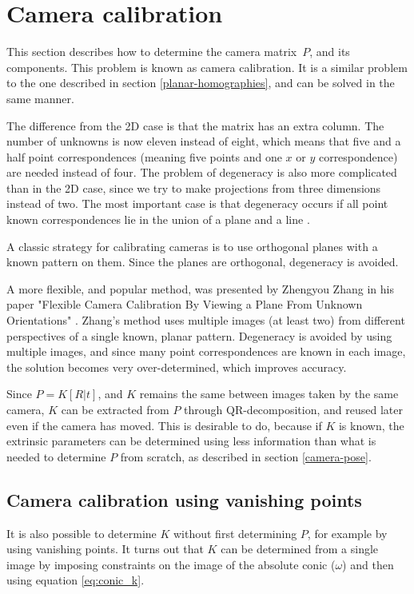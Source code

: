 \section{Camera calibration} \label{camera-calibration}
This section describes how to determine the camera matrix $P$, and its components.
This problem is known as camera calibration.
It is a similar problem to the one described in section \ref{planar-homographies}, and can be solved in the same manner.

The difference from the 2D case is that the matrix has an extra column. The number of unknowns is now eleven instead of eight, which means that five and a half point correspondences (meaning five points and one $x$ or $y$ correspondence) are needed instead of four.
The problem of degeneracy is also more complicated than in the 2D case, since we try to make projections from three dimensions instead of two.
The most important case is that degeneracy occurs if all point known correspondences lie in the union of a plane and a line \cite[p. 179-180]{hartley-zisserman}. 

A classic strategy for calibrating cameras is to use orthogonal planes with a known pattern on them. 
Since the planes are orthogonal, degeneracy is avoided.

A more flexible, and popular method, was presented by Zhengyou Zhang in his paper "Flexible Camera Calibration By Viewing a Plane From Unknown Orientations" \cite{zhang-calibration}.
Zhang's method uses multiple images (at least two) from different perspectives of a single known, planar pattern.
Degeneracy is avoided by using multiple images, and since many point correspondences are known in each image, the solution becomes very over-determined, which improves accuracy.

Since $P=K[R|t]$, and $K$ remains the same between images taken by the same camera, $K$ can be extracted from $P$ through QR-decomposition, and reused later even if the camera has moved. 
This is desirable to do, because if $K$ is known, the extrinsic parameters can be determined using less information than what is needed to determine $P$ from scratch, as described in section \ref{camera-pose}.

\subsection{Camera calibration using vanishing points} \label{background:vanishing_point_calibration}
It is also possible to determine $K$ without first determining $P$, for example by using vanishing points.
It turns out that $K$ can be determined from a single image by imposing constraints on the image of the absolute conic ($\omega$) and then using equation \ref{eq:conic_k}.

